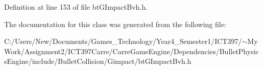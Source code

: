 Definition at line 153 of file btGImpactBvh.h.

The documentation for this class was generated from the following file:\begin{CompactItemize}
\item 
C:/Users/New/Documents/Games\_\-Technology/Year4\_\-Semester1/ICT397/$\sim$My Work/Assignment2/ICT397Carre/CarreGameEngine/Dependencies/BulletPhysicsEngine/include/BulletCollision/Gimpact/btGImpactBvh.h\end{CompactItemize}
